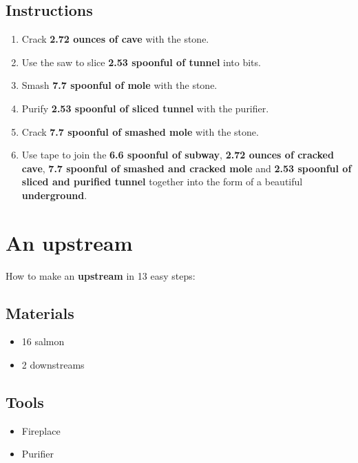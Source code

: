\documentclass{article}
\begin{document}
\subsection{Instructions}\begin{enumerate}
\item 
Crack \textbf{2.72 ounces of cave} with the stone.
\item 
Use the saw to slice \textbf{2.53 spoonful of tunnel} into bits.
\item 
Smash \textbf{7.7 spoonful of mole} with the stone.
\item 
Purify \textbf{2.53 spoonful of sliced tunnel} with the purifier.
\item 
Crack \textbf{7.7 spoonful of smashed mole} with the stone.
\item 
Use tape to join the \textbf{6.6 spoonful of subway}, \textbf{2.72 ounces of cracked cave}, \textbf{7.7 spoonful of smashed and cracked mole} and \textbf{2.53 spoonful of sliced and purified tunnel} together into the form of a beautiful \textbf{underground}.
\end{enumerate}
\newpage
\section{An upstream}How to make an \textbf{upstream} in 13 easy steps:

\subsection{Materials}\begin{itemize}
\item 
16 salmon
\item 
2 downstreams
\end{itemize}
\subsection{Tools}\begin{itemize}
\item 
Fireplace
\item 
Purifier
\end{itemize}
\end{document}
